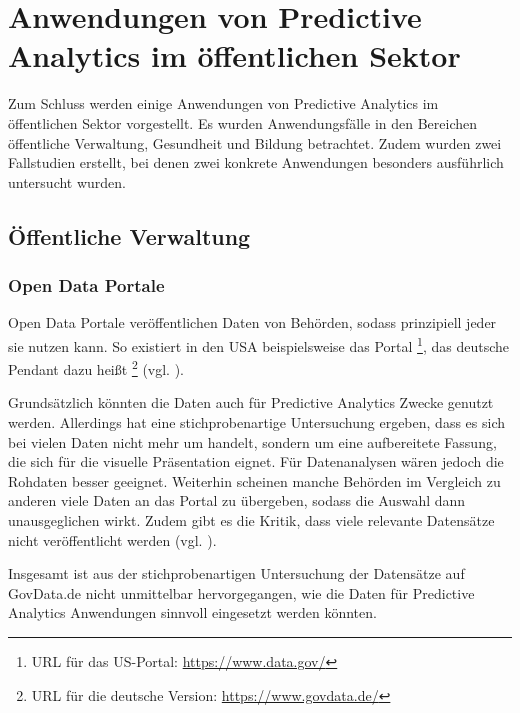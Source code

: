 \chapter{Anwendungen von Predictive Analytics im öffentlichen Sektor}

Zum Schluss werden einige Anwendungen von Predictive Analytics im öffentlichen
Sektor vorgestellt. Es wurden Anwendungsfälle in den Bereichen öffentliche Verwaltung,
Gesundheit und Bildung betrachtet. Zudem wurden zwei Fallstudien erstellt, bei denen
zwei konkrete Anwendungen besonders ausführlich untersucht wurden.


\section{Öffentliche Verwaltung}


\subsection{Open Data Portale}

Open Data Portale veröffentlichen Daten von Behörden, sodass prinzipiell jeder
sie nutzen kann. So existiert in den USA beispielsweise das Portal \grqq{}\footnote{
URL für das US-Portal: \url{https://www.data.gov/}
}, das deutsche Pendant dazu heißt \grqq{}\footnote{
URL für die deutsche Version: \url{https://www.govdata.de/} 
} (vgl. \cite{Borchers}). 

Grundsätzlich könnten die Daten auch für Predictive Analytics Zwecke genutzt werden.
Allerdings hat eine stichprobenartige Untersuchung ergeben, dass es sich bei vielen Daten
nicht mehr um \grqq{} handelt, sondern um eine aufbereitete Fassung, die sich
für die visuelle Präsentation eignet. Für Datenanalysen wären jedoch die Rohdaten besser geeignet.
Weiterhin scheinen manche Behörden im Vergleich zu anderen viele Daten an das Portal zu übergeben,
sodass die Auswahl dann unausgeglichen wirkt. Zudem gibt es die Kritik, dass viele relevante
Datensätze nicht veröffentlicht werden (vgl. \cite{Krempl}).

Insgesamt ist aus der stichprobenartigen Untersuchung der Datensätze auf GovData.de nicht unmittelbar
hervorgegangen, wie die Daten für Predictive Analytics Anwendungen sinnvoll eingesetzt werden könnten. 


